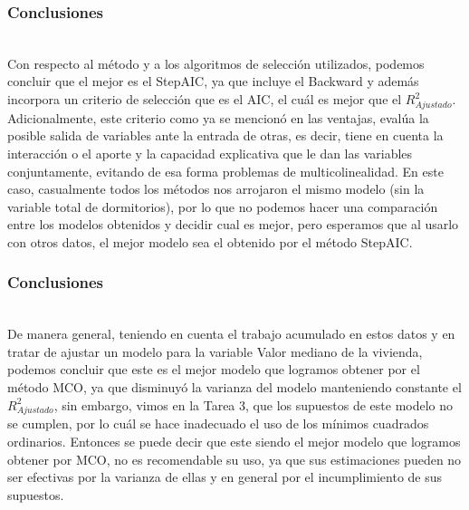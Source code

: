 \documentclass[12pt]{beamer}
\begin{document}
\begin{frame}
\frametitle{Conclusiones}
~\\Con respecto al método y a los algoritmos de selección utilizados, podemos concluir que el mejor es el StepAIC, ya que incluye el Backward y además incorpora un criterio de selección que es el AIC, el cuál es mejor que el $R^2_{Ajustado}$. Adicionalmente, este criterio como ya se mencionó en las ventajas, evalúa la posible salida de variables ante la entrada de otras, es decir, tiene en cuenta la interacción o el aporte y la capacidad explicativa que le dan las variables conjuntamente, evitando de esa forma problemas de multicolinealidad. En este caso, casualmente todos los métodos nos arrojaron el mismo modelo (sin la variable total de dormitorios), por lo que no podemos hacer una comparación entre los modelos obtenidos y decidir cual es mejor, pero esperamos que al usarlo con otros datos, el mejor modelo sea el obtenido por el método StepAIC.
\end{frame}

\begin{frame}
\frametitle{Conclusiones}
~\\De manera general, teniendo en cuenta el trabajo acumulado en estos datos y en tratar de ajustar un modelo para la variable Valor mediano de la vivienda, podemos concluir que este es el mejor modelo que logramos obtener por el método MCO, ya que disminuyó la varianza del modelo manteniendo constante el $R^2_{Ajustado}$, sin embargo, vimos en la Tarea 3, que los supuestos de este modelo no se cumplen, por lo cuál se hace inadecuado el uso de los mínimos cuadrados ordinarios. Entonces se puede decir que este siendo el mejor modelo que logramos obtener por MCO, no es recomendable su uso, ya que sus estimaciones pueden no ser efectivas por la varianza de ellas y en general por el incumplimiento de sus supuestos.
\end{frame}
\end{document}
